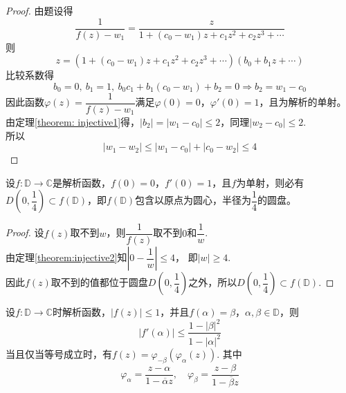 \begin{proof}

    由题设得
    \[\dfrac{1}{f(z) - w_1} = \dfrac{z}{1 + (c_0 - w_1)z + c_1 z^2 + c_2 z^3 + \cdots}\]
    则
    \[z = (1 + (c_0 - w_1)z + c_1 z^2 + c_2 z^3 + \cdots) (b_0 + b_1 z + \cdots)\]
    比较系数得
    \[b_0 = 0, \ b_1 = 1, \ b_0 c_1 + b_1(c_0 - w_1) + b_2 = 0 \Rightarrow b_2 = w_1 - c_0\]
    因此函数$\varphi(z) = \dfrac{1}{f(z) - w_1}$满足$\varphi(0) = 0$，$\varphi'(0) = 1$，且为解析的单射。 \\
    由定理\ref{theorem:
    injective1}得，$|b_2| = |w_1 - c_0| \leq 2$，同理$|w_2 - c_0| \leq 2$. \\
    所以
    \[|w_1 - w_2| \leq |w_1 - c_0| + |c_0 - w_2| \leq 4\]
    
\end{proof}

\begin{theorem}

    设$f: \mathbb{D} \to \mathbb{C}$是解析函数，$f(0) = 0$，$f'(0) = 1$，且$f$为单射，则必有$D\left( 0, \dfrac{1}{4} \right) \subset f(\mathbb{D})$，即$f(\mathbb{D})$包含以原点为圆心，半径为$\dfrac{1}{4}$的圆盘。

\end{theorem}

\begin{proof}

    设$f(z)$取不到$w$，则$\dfrac{1}{f(z)}$取不到$0$和$\dfrac{1}{w}$. \\
    由定理\ref{theorem:injective2}知$\left| 0 - \dfrac{1}{w} \right| \leq 4$， 即$|w| \geq 4$. \\
    因此$f(z)$取不到的值都位于圆盘$D\left( 0, \dfrac{1}{4} \right)$之外，所以$D\left( 0, \dfrac{1}{4} \right) \subset f(\mathbb{D})$.

\end{proof}

\begin{proposition}

    设$f:\mathbb{D} \to \mathbb{C}$时解析函数，$|f(z)| \leq 1$，并且$f(\alpha) = \beta$，$\alpha, \beta \in \mathbb{D}$，则
    \[|f'(\alpha)| \leq \dfrac{1 - |\beta|^2}{1 - |\alpha|^2}\]
    当且仅当等号成立时，有$f(z) = \varphi_{-\beta}(\varphi_{\alpha}(z))$. 其中
    \[\varphi_{\alpha} = \dfrac{z - \alpha}{1 - \overline{\alpha}{z}}, \quad \varphi_{\beta} = \dfrac{z - \beta}{1 - \overline{\beta}{z}}\]

\end{proposition}

